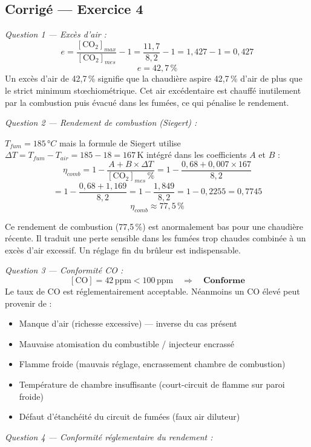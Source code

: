 \subsection*{Corrigé — Exercice 4}

\textit{Question 1 — Excès d'air :}
\[
  e = \frac{[\text{CO}_2]_{max}}{[\text{CO}_2]_{mes}} - 1 = \frac{11{,}7}{8{,}2} - 1 = 1{,}427 - 1 = 0{,}427
\]
\[
  \boxed{e = 42{,}7\,\%}
\]
Un excès d'air de 42,7\,\% signifie que la chaudière aspire 42,7\,\% d'air de plus que le strict minimum stœchiométrique. Cet air excédentaire est chauffé inutilement par la combustion puis évacué dans les fumées, ce qui pénalise le rendement.

\textit{Question 2 — Rendement de combustion (Siegert) :}

$T_{fum} = 185\,°C$ mais la formule de Siegert utilise $\Delta T = T_{fum} - T_{air} = 185 - 18 = 167\,\text{K}$ intégré dans les coefficients $A$ et $B$ :
\[
  \eta_{comb} = 1 - \frac{A + B \times \Delta T}{[\text{CO}_2]_{mes}\,\%} = 1 - \frac{0{,}68 + 0{,}007 \times 167}{8{,}2}
\]
\[
  = 1 - \frac{0{,}68 + 1{,}169}{8{,}2} = 1 - \frac{1{,}849}{8{,}2} = 1 - 0{,}2255 = 0{,}7745
\]
\[
  \boxed{\eta_{comb} \approx 77{,}5\,\%}
\]

\begin{attention}
Ce rendement de combustion (77,5\,\%) est anormalement bas pour une chaudière récente. Il traduit une perte sensible dans les fumées trop chaudes combinée à un excès d'air excessif. Un réglage fin du brûleur est indispensable.
\end{attention}

\textit{Question 3 — Conformité CO :}
\[
  [\text{CO}] = 42\,\text{ppm} < 100\,\text{ppm} \quad \Rightarrow \quad \textbf{Conforme}
\]
Le taux de CO est réglementairement acceptable. Néanmoins un CO élevé peut provenir de :
\begin{itemize}
  \item Manque d'air (richesse excessive) — inverse du cas présent
  \item Mauvaise atomisation du combustible / injecteur encrassé
  \item Flamme froide (mauvais réglage, encrassement chambre de combustion)
  \item Température de chambre insuffisante (court-circuit de flamme sur paroi froide)
  \item Défaut d'étanchéité du circuit de fumées (faux air diluteur)
\end{itemize}

\textit{Question 4 — Conformité réglementaire du rendement :}

